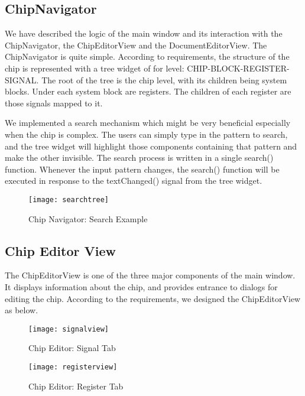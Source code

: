 \subsection{ChipNavigator}
We have described the logic of the main window and its interaction with the ChipNavigator, the ChipEditorView and the DocumentEditorView. The ChipNavigator is quite simple. According to requirements, the structure of the chip is represented with a tree widget of for level: CHIP-BLOCK-REGISTER-SIGNAL. The root of the tree is the chip level, with its children being system blocks. Under each system block are registers. The children of each register are those signals mapped to it.

We implemented a search mechanism which might be very beneficial especially when the chip is complex. The users can simply type in the pattern to search, and the tree widget will highlight those components containing that pattern and make the other invisible. The search process is written in a single search() function. Whenever the input pattern changes, the search() function will be executed in response to the textChanged() signal from the tree widget.

\begin{figure}[htbp]
\centering
\texttt{[image: searchtree]}
\caption{Chip Navigator: Search Example\label{fig:Chip Navigator: Search Example}}
\end{figure}

\subsection{Chip Editor View}
The ChipEditorView is one of the three major components of the main window. It displays information about the chip, and provides entrance to dialogs for editing the chip. According to the requirements, we designed the ChipEditorView as below.

\begin{figure}[htbp]
\centering
\texttt{[image: signalview]}
\caption{Chip Editor: Signal Tab\label{fig:Chip Editor: Signal Tab}}
\end{figure}

\begin{figure}[htbp]
\centering
\texttt{[image: registerview]}
\caption{Chip Editor: Register Tab\label{fig:Chip Editor: Register Tab}}
\end{figure}

